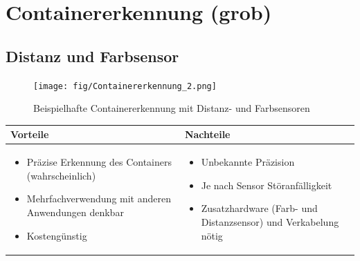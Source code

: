 
\section{Containererkennung (grob)}


\subsection{Distanz und Farbsensor}

\begin{figure} [hbp]
	\centering
	\texttt{[image: fig/Containererkennung\_2.png]}
	\caption{Beispielhafte Containererkennung mit Distanz- und Farbsensoren}
\end{figure}

\begin{table}[h]
\begin{tabular}{p{} | p{}}


 \textbf{Vorteile} & \textbf{Nachteile} \\ \hline
	 
\begin{itemize}
\item Präzise Erkennung des Containers (wahrscheinlich)
\item Mehrfachverwendung mit anderen Anwendungen denkbar
\item Kostengünstig
\end{itemize}

 
 &
 
\begin{itemize}
\item Unbekannte Präzision
\item Je nach Sensor Störanfälligkeit
\item Zusatzhardware (Farb- und Distanzsensor) und Verkabelung nötig
\end{itemize}

\end{tabular}
\end{table}

